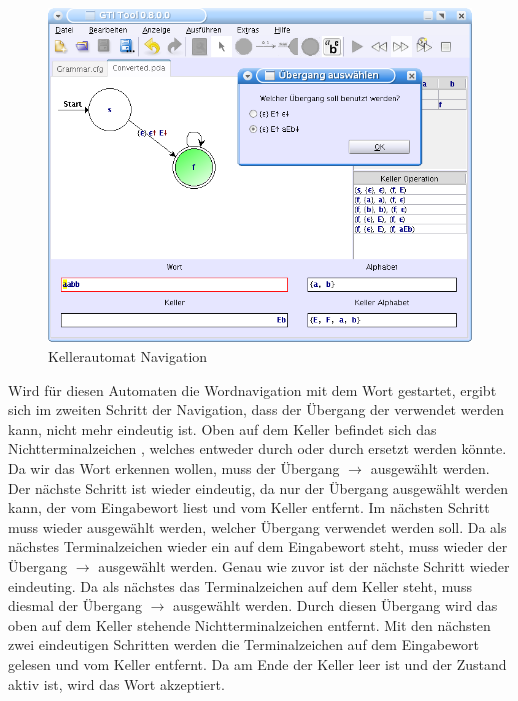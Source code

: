 \begin{figure}[h]
\begin{center}
\includegraphics[width=12cm]{images/grammar_pda.png}
\caption{Kellerautomat Navigation}
\end{center}
\end{figure}

Wird für diesen Automaten die Wordnavigation mit dem Wort  gestartet,
ergibt sich im zweiten Schritt der Navigation, dass der Übergang der verwendet
werden kann, nicht mehr eindeutig ist. Oben auf dem Keller befindet sich das
Nichtterminalzeichen , welches entweder durch
\TerminalSymbol{$\epsilon$} oder durch
 ersetzt werden könnte. Da
wir das Wort  erkennen wollen, muss der Übergang 
$\to$  ausgewählt werden.
Der nächste Schritt ist wieder eindeutig, da nur der Übergang ausgewählt werden
kann, der  vom Eingabewort liest und  vom
Keller entfernt. Im nächsten Schritt muss wieder ausgewählt werden, welcher
Übergang verwendet werden soll. Da als nächstes Terminalzeichen wieder ein
 auf dem Eingabewort steht, muss wieder der Übergang 
$\to$  ausgewählt werden.
Genau wie zuvor ist der nächste Schritt wieder eindeuting. Da als nächstes das
Terminalzeichen  auf dem Keller steht, muss diesmal der
Übergang  $\to$ \TerminalSymbol{$\epsilon$} ausgewählt werden.
Durch diesen Übergang wird das oben auf dem Keller stehende
Nichtterminalzeichen  entfernt. Mit den nächsten zwei
eindeutigen Schritten werden die Terminalzeichen  auf dem
Eingabewort gelesen und vom Keller entfernt. Da am Ende der Keller leer ist und
der Zustand  aktiv ist, wird das Wort akzeptiert.